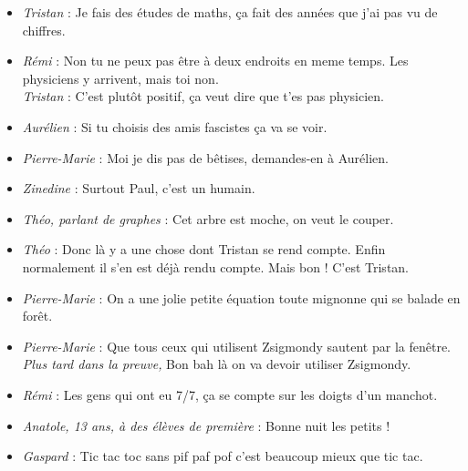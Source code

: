 \setlength{\parindent}{0cm}



\begin{itemize}

\item \textit{Tristan} : \og Je fais des études de maths, ça fait des années que j'ai pas vu de chiffres. \fg

\item \textit{Rémi} : \og Non tu ne peux pas être à deux endroits en meme temps. Les physiciens y arrivent, mais toi non. \fg \\
\textit{Tristan} : \og C'est plutôt positif, ça veut dire que t'es pas physicien. \fg

\item \textit{Aurélien} : \og Si tu choisis des amis fascistes ça va se voir. \fg

\item \textit{Pierre-Marie} : \og Moi je dis pas de bêtises, demandes-en à Aurélien. \fg

\item \textit{Zinedine} : \og Surtout Paul, c'est un humain. \fg

\item \textit{Théo, parlant de graphes} : \og Cet arbre est moche, on veut le couper. \fg

\item \textit{Théo} : \og Donc là y a une chose dont Tristan se rend compte. Enfin normalement il s'en est déjà rendu compte. Mais bon ! C'est Tristan. \fg

\item \textit{Pierre-Marie} : \og On a une jolie petite équation toute mignonne qui se balade en forêt. \fg

\item \textit{Pierre-Marie} : \og Que tous ceux qui utilisent Zsigmondy sautent par la fenêtre. \fg \\
\textit{Plus tard dans la preuve,} Bon bah là on va devoir utiliser Zsigmondy.

\item \textit{Rémi} : \og Les gens qui ont eu 7/7, ça se compte sur les doigts d'un manchot. \fg

\item \textit{Anatole, 13 ans, à des élèves de première} : \og Bonne nuit les petits ! \fg

\item \textit{Gaspard} : \og Tic tac toc sans pif paf pof c'est beaucoup mieux que tic tac. \fg


\end{itemize}
